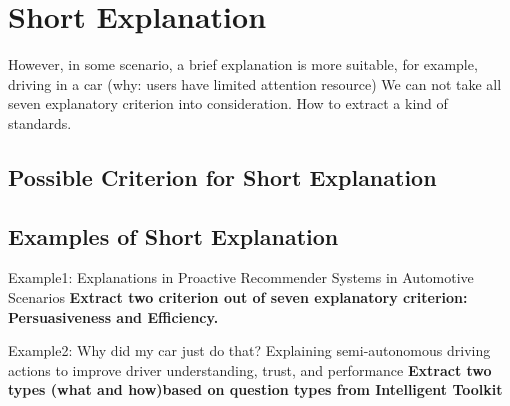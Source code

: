 \section{Short Explanation}
    However, in some scenario, a brief explanation is more suitable, for example, driving in a car
    (why: users have limited attention resource)
    We can not take all seven explanatory criterion into consideration.
    How to extract a kind of standards.
    
    \subsection{Possible Criterion for Short Explanation}

    \subsection{Examples of Short Explanation}
        Example1: Explanations in Proactive Recommender Systems in Automotive Scenarios \cite{bader122011explanations}
        \textbf{Extract two criterion out of seven explanatory criterion: Persuasiveness and Efficiency.}

        Example2: Why did my car just do that? Explaining semi-autonomous driving actions to improve driver understanding, trust, and performance\cite{koo2015did}
        \textbf{Extract two types (what and how)based on question types from Intelligent Toolkit} \cite{Brian2010toolkit, lim2011design}
